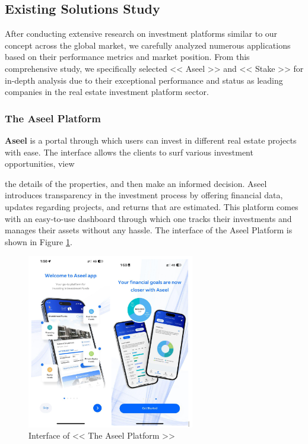 \subsection{Existing Solutions Study}

After conducting extensive research on investment platforms similar to our concept across the global market, we carefully analyzed numerous applications based on their performance metrics and market position. From this comprehensive study, we specifically selected << Aseel >> \cite{AssilEyeInstitute} and << Stake >> \cite{StakeWebsite} for in-depth analysis \cite{G2CompetitiveAnalysis2024, AsanaCompetitiveAnalysis2024} due to their exceptional performance and status as leading companies in the real estate investment platform sector.

\subsubsection{The Aseel Platform}

\textbf{\textcolor{primary}{Aseel}} \cite{AssilEyeInstitute} is a portal through which users can invest in different real estate projects with ease. The interface allows the clients to surf various investment opportunities, view 

\newpage

the details of the properties, and then make an informed decision. Aseel introduces transparency in the investment process by offering financial data, updates regarding projects, and returns that are estimated. This platform comes with an easy-to-use dashboard through which one tracks their investments and manages their assets without any hassle. The interface of the Aseel Platform is shown in Figure \ref{fig:aseel-platform}.


\begin{figure}[htbp]
    \centering
    \includegraphics[width=0.65\textwidth]{images/Interface-of-the Aseel Platform.png}
    \caption{Interface of << The Aseel Platform >>}
    \label{fig:aseel-platform}
\end{figure}

